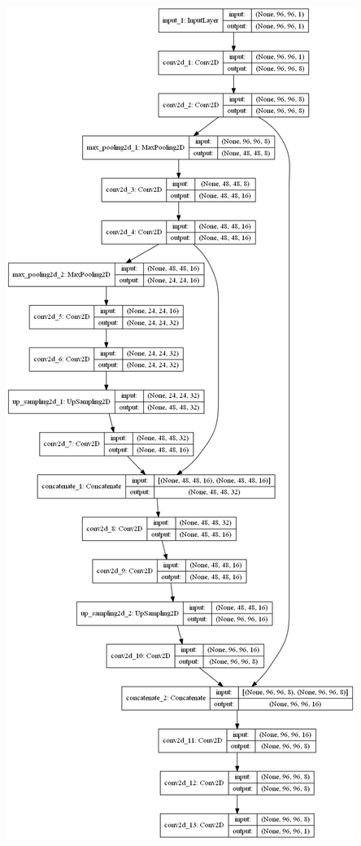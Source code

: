 \documentclass[a4paper,11pt,twoside]{report}
\theoremstyle{definition}
\begin{document}
\begin{minipage}{\linewidth}
	\centering
	\includegraphics[height=0.8\textheight]{segmentation/our_architecture.png}
	\label{Architektura}
\end{minipage}
\end{document}
